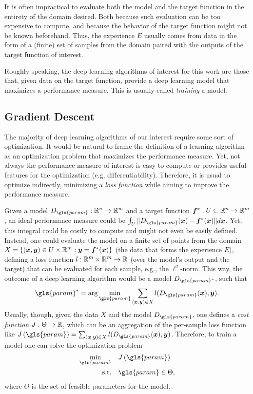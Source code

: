 It is often impractical to evaluate both the model and the target function in the entirety of the domain desired.
Both because such evaluation can be too expensive to compute, and because the behavior of the target function might not be known beforehand.
Thus, the experience $E$ usually comes from data in the form of a (finite) set of samples from the domain paired with the outputs of the target function of interest.

Roughly speaking, the deep learning algorithms of interest for this work are those that, given data on the target function, provide a deep learning model that maximizes a performance measure.
This is usually called \emph{training} a model.

\subsection{Gradient Descent}

The majority of deep learning algorithms of our interest require some sort of optimization.
It would be natural to frame the definition of a learning algorithm as an optimization problem that maximizes the performance measure.
Yet, not always the performance measure of interest is easy to compute or provides useful features for the optimization (e.g, differentiability).
Therefore, it is usual to optimize indirectly, minimizing a \textit{loss function} while aiming to improve the performance measure.

Given a model $D_{\gls{param}}:\R^n\to\R^m$ and a target function $\bm{f}^*:U\subset\mathbb{R}^n\to\mathbb{R}^m$, an ideal performance measure could be $\int_U \|D_{\gls{param}}(\bm{x}) - \bm{f}^*(\bm{x})\|d\bm{x}$.
Yet, this integral could be costly to compute and might not even be easily defined.
Instead, one could evaluate the model on a finite set of points from the domain $X=\{(\bm{x},\bm{y})\in U\times\mathbb{R}^m : \bm{y}=\bm{f}^*(\bm{x})\}$ (the data that forms the experience $E$), defining a loss function $l:\mathbb{R}^m\times\mathbb{R}^m\to\mathbb{R}$ (over the model's output and the target) that can be evaluated for each sample, e.g., the $\ell^2$-norm.
This way, the outcome of a deep learning algorithm would be a model $D_{\gls{param}^*}$, such that \[
\gls{param}^* = \arg\min_{\gls{param}} \sum_{(\bm{x},\bm{y})\in X} l(D_{\gls{param}}(\bm{x}), \bm{y})
.\] Usually, though, given the data $X$ and the model $D_{\gls{param}}$, one defines a \emph{cost function} $J: \Theta\to\mathbb{R}$, which can be an aggregation of the per-sample loss function like $J\left( \gls{param} \right) = \sum_{(\bm{x},\bm{y})\in X} l(D_{\gls{param}}(\bm{x}), \bm{y})$.
Therefore, to train a model one can solve the optimization problem
\begin{align*}
    \min_{\gls{param}} \quad & J\left( \gls{param} \right)  \\
    \text{s.t.} \quad & \gls{param} \in \Theta
,\end{align*}
where $\Theta$ is the set of feasible parameters for the model.

